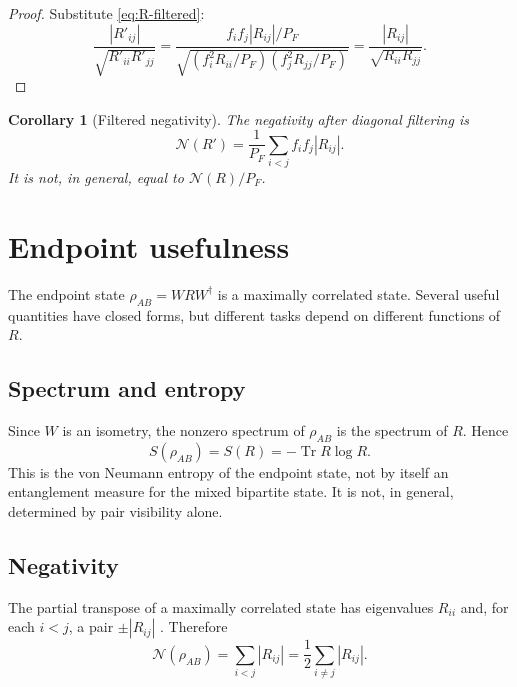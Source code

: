 \documentclass[reprint,aps,pra,superscriptaddress,nofootinbib,longbibliography]{revtex4-2}
\newtheorem{corollary}[theorem]{Corollary}
\newcommand{\Tr}{\operatorname{Tr}}
\newcommand{\N}{\mathcal N}
\begin{document}
\begin{proof}
Substitute \eqref{eq:R-filtered}:
\[
\frac{|R'_{ij}|}{\sqrt{R'_{ii}R'_{jj}}}
=
\frac{f_if_j|R_{ij}|/P_F}{\sqrt{(f_i^2R_{ii}/P_F)(f_j^2R_{jj}/P_F)}}
=
\frac{|R_{ij}|}{\sqrt{R_{ii}R_{jj}}}.
\]
\end{proof}

\begin{corollary}[Filtered negativity]
The negativity after diagonal filtering is
\begin{equation}
\N(R')
=
\frac{1}{P_F}\sum_{i<j} f_if_j |R_{ij}|.
\label{eq:filtered-negativity}
\end{equation}
It is not, in general, equal to \(\N(R)/P_F\).
\end{corollary}

\section{Endpoint usefulness}
\label{sec:usefulness}

The endpoint state \(\rho_{AB}=WRW^\dagger\) is a maximally correlated state.  Several useful quantities have closed forms, but different tasks depend on different functions of \(R\).

\subsection{Spectrum and entropy}

Since \(W\) is an isometry, the nonzero spectrum of \(\rho_{AB}\) is the spectrum of \(R\).  Hence
\begin{equation}
S(\rho_{AB})
=
S(R)
=
-\Tr R\log R.
\label{eq:entropy}
\end{equation}
This is the von Neumann entropy of the endpoint state, not by itself an entanglement measure for the mixed bipartite state.  It is not, in general, determined by pair visibility alone.

\subsection{Negativity}

The partial transpose of a maximally correlated state has eigenvalues \(R_{ii}\) and, for each \(i<j\), a pair \(\pm |R_{ij}|\) \cite{Rains1999,VidalWerner2002}.  Therefore
\begin{equation}
\N(\rho_{AB})
=
\sum_{i<j}|R_{ij}|
=
\frac12\sum_{i\ne j}|R_{ij}|.
\label{eq:negativity}
\end{equation}
\end{document}
